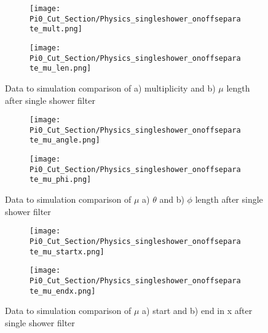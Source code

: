 \begin{figure}[H]
\centering
  \begin{subfigure}[t]{0.3\textwidth}
    \centering
\texttt{[image: Pi0\_Cut\_Section/Physics\_singleshower\_onoffseparate\_mult.png]}
  \caption{ }
  \end{subfigure} 
  \hspace{20mm}
  \begin{subfigure}[t]{0.3\textwidth}
    \centering
\texttt{[image: Pi0\_Cut\_Section/Physics\_singleshower\_onoffseparate\_mu\_len.png]}
  \caption{ }
  \end{subfigure} 

\caption{ Data to simulation comparison of a) multiplicity and b) $\mu$ length after single shower filter }
\label{fig:physics_singleshower_mulen}
\end{figure}

\begin{figure}[H]
\centering
  \begin{subfigure}[t]{0.3\textwidth}
    \centering
\texttt{[image: Pi0\_Cut\_Section/Physics\_singleshower\_onoffseparate\_mu\_angle.png]}
  \caption{ }
  \end{subfigure} 
  \hspace{20mm}
  \begin{subfigure}[t]{0.3\textwidth}
    \centering
\texttt{[image: Pi0\_Cut\_Section/Physics\_singleshower\_onoffseparate\_mu\_phi.png]}
  \caption{ }
  \end{subfigure} 
\caption{ Data to simulation comparison of $\mu$ a) $\theta$ and b) $\phi$ length after single shower filter }
\label{fig:physics_singleshower_muphi}
\end{figure}

\begin{figure}[H]
\centering
  \begin{subfigure}[t]{0.3\textwidth}
    \centering
\texttt{[image: Pi0\_Cut\_Section/Physics\_singleshower\_onoffseparate\_mu\_startx.png]}
  \caption{ }
  \end{subfigure} 
  \hspace{30mm}
  \begin{subfigure}[t]{0.3\textwidth}
    \centering
\texttt{[image: Pi0\_Cut\_Section/Physics\_singleshower\_onoffseparate\_mu\_endx.png]}
  \caption{ }
  \end{subfigure} 
\caption{ Data to simulation comparison of $\mu$ a) start and b) end in x after single shower filter }
\label{fig:physics_singleshower_x}
\end{figure}


